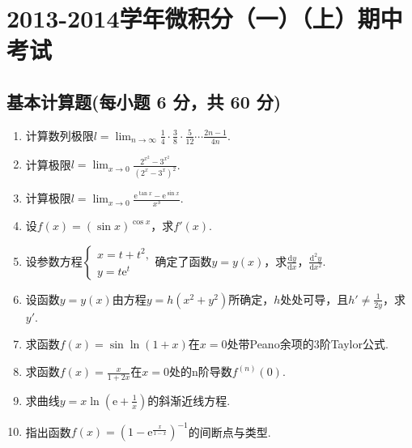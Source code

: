 \documentclass[../Main.tex]{subfiles}
\begin{document}
\chapter{2013-2014学年微积分（一）（上）期中考试}

\section{基本计算题(每小题 6 分，共 60 分)}
\begin{enumerate}
    \item 计算数列极限$l=\lim_{n\to\infty}\frac{1}{4}\cdot\frac{3}{8}\cdot\frac{5}{12}
              \cdots\frac{2n-1}{4n}$.
          \vspace{11em}

    \item 计算极限$l=\lim_{x\to 0}\frac{2^{x^2}-3^{x^2}}{\left(2^{x}-3^{x}\right)^{2}}$.
          \vspace{11em}

    \item 计算极限$l=\lim_{x\to 0}\frac{\mathrm{e}^{\tan x}-\mathrm{e}^{\sin x}}{x^{3}}$.
          \vspace{11em}

    \item 设$f(x)=(\sin x)^{\cos x}$，求$f'(x)$.
          \vspace{10em}

    \item 设参数方程$\begin{cases}
                  x=t+t^{2}, \\
                  y=t\mathrm{e}^{t}
              \end{cases}$确定了函数$y=y(x)$，求$\frac{\mathrm{d}y}{\mathrm{d}x}$，$\frac{\mathrm{d}^{2}
                  y}{\mathrm{d}x^{2}}$.
          \vspace{10em}

    \item 设函数$y=y(x)$由方程$y=h(x^{2}+y^{2})$所确定，$h$处处可导，且$h'\neq\frac{1}{2y}$，求$y
              '$.
          \vspace{10em}

    \item 求函数$f(x)=\sin\ln(1+x)$在$x=0$处带Peano余项的3阶Taylor公式.
          \vspace{10em}

    \item 求函数$f(x)=\frac{x}{1+2x}$在$x=0$处的n阶导数$f^{(n)}(0)$.
          \vspace{10em}

    \item 求曲线$y=x\ln\left(\mathrm{e}+\frac{1}{x}\right)$的斜渐近线方程.
          \vspace{13em}

    \item 指出函数$f(x)=\left(1-\mathrm{e}^{\frac{x}{1-x}}\right)^{-1}$的间断点与类型.
          \vspace{13em}
\end{enumerate}
\end{document}
